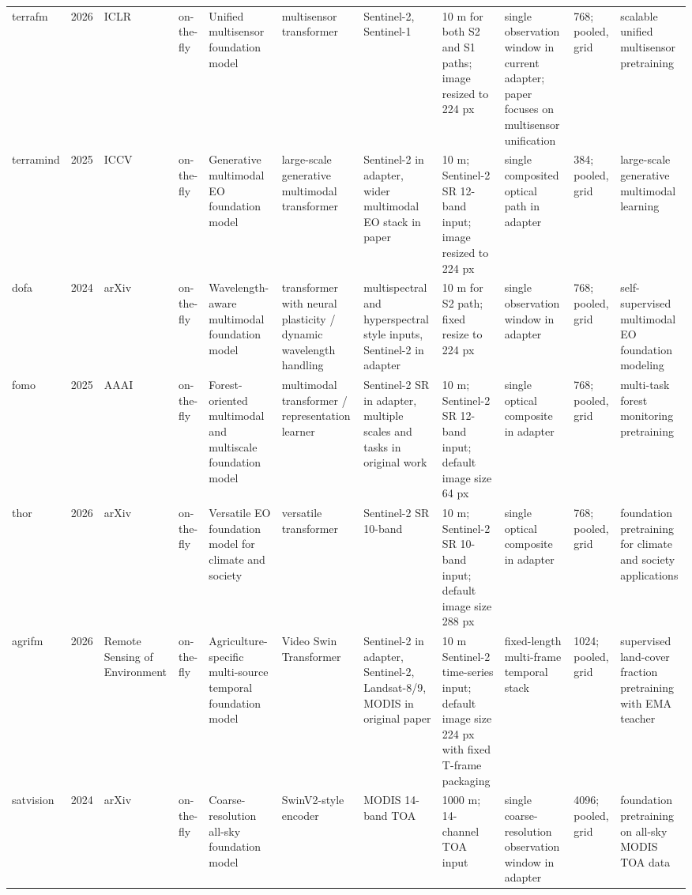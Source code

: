 \begin{landscape}
\begin{longtable}{p{1.45cm}p{0.75cm}p{1.2cm}p{0.95cm}p{2.25cm}p{2.05cm}p{2.75cm}p{2.35cm}p{2.25cm}p{1.55cm}p{3.0cm}}
terrafm & 2026 & ICLR & on-the-fly & Unified multisensor foundation model & multisensor transformer & Sentinel-2, Sentinel-1 & 10 m for both S2 and S1 paths; image resized to 224 px & single observation window in current adapter; paper focuses on multisensor unification & 768; pooled, grid & scalable unified multisensor pretraining \\
terramind & 2025 & ICCV & on-the-fly & Generative multimodal EO foundation model & large-scale generative multimodal transformer & Sentinel-2 in adapter, wider multimodal EO stack in paper & 10 m; Sentinel-2 SR 12-band input; image resized to 224 px & single composited optical path in adapter & 384; pooled, grid & large-scale generative multimodal learning \\
dofa & 2024 & arXiv & on-the-fly & Wavelength-aware multimodal foundation model & transformer with neural plasticity / dynamic wavelength handling & multispectral and hyperspectral style inputs, Sentinel-2 in adapter & 10 m for S2 path; fixed resize to 224 px & single observation window in adapter & 768; pooled, grid & self-supervised multimodal EO foundation modeling \\
fomo & 2025 & AAAI & on-the-fly & Forest-oriented multimodal and multiscale foundation model & multimodal transformer / representation learner & Sentinel-2 SR in adapter, multiple scales and tasks in original work & 10 m; Sentinel-2 SR 12-band input; default image size 64 px & single optical composite in adapter & 768; pooled, grid & multi-task forest monitoring pretraining \\
thor & 2026 & arXiv & on-the-fly & Versatile EO foundation model for climate and society & versatile transformer & Sentinel-2 SR 10-band & 10 m; Sentinel-2 SR 10-band input; default image size 288 px & single optical composite in adapter & 768; pooled, grid & foundation pretraining for climate and society applications \\
agrifm & 2026 & Remote Sensing of Environment & on-the-fly & Agriculture-specific multi-source temporal foundation model & Video Swin Transformer & Sentinel-2 in adapter, Sentinel-2, Landsat-8/9, MODIS in original paper & 10 m Sentinel-2 time-series input; default image size 224 px with fixed T-frame packaging & fixed-length multi-frame temporal stack & 1024; pooled, grid & supervised land-cover fraction pretraining with EMA teacher \\
satvision & 2024 & arXiv & on-the-fly & Coarse-resolution all-sky foundation model & SwinV2-style encoder & MODIS 14-band TOA & 1000 m; 14-channel TOA input & single coarse-resolution observation window in adapter & 4096; pooled, grid & foundation pretraining on all-sky MODIS TOA data \\
\end{longtable}
\normalsize
\end{landscape}
